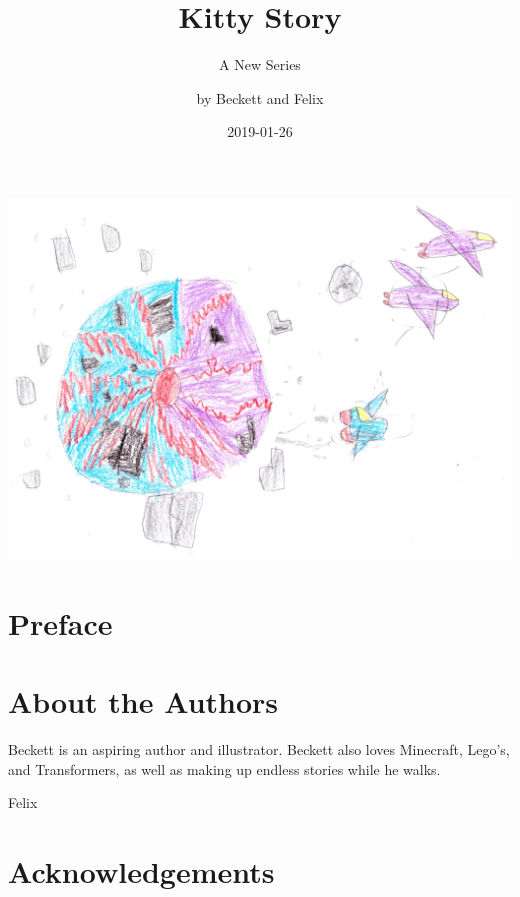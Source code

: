 \documentclass[12pt,oneside]{krantz}
\title{Kitty Story}
\subtitle{A New Series}
\author{by Beckett and Felix}
\date{2019-01-26}
\begin{document}
\maketitle

{
\setcounter{tocdepth}{1}
\tableofcontents
}
\hypertarget{section}{%
\chapter*{}\label{section}}

\includegraphics{img/catplanet.jpg}

\hypertarget{preface}{%
\chapter*{Preface}\label{preface}}


\hypertarget{about-the-authors}{%
\chapter*{About the Authors}\label{about-the-authors}}


Beckett is an aspiring author and illustrator. Beckett also loves
Minecraft, Lego's, and Transformers, as well as making up endless
stories while he walks.

Felix

\hypertarget{acknowledgements}{%
\chapter*{Acknowledgements}\label{acknowledgements}}
\end{document}

